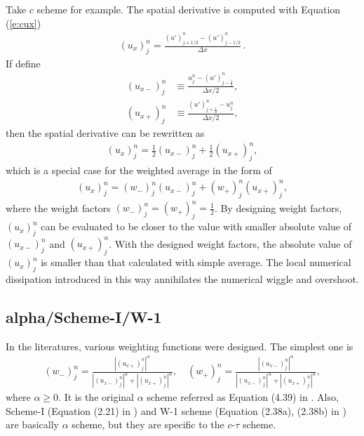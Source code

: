 \documentclass[11pt,dvips]{article}
\numberwithin{equation}{section}
\begin{document}
Take $c$ scheme for example.  The spatial derivative is computed with Equation
(\ref{e:cux})
\begin{align*}
  (u_x)_j^n = \frac{(u')_{j+1/2}^n - (u')_{j-1/2}^n}{\Delta x}\,.
\end{align*}
If define
\begin{align}
  (u_{x-})_j^n &\equiv
    \frac{u_j^n - (u')_{j-\frac{1}{2}}^n}{\Delta x/2}, \label{e:ux-} \\
  (u_{x+})_j^n &\equiv
    \frac{(u')_{j+\frac{1}{2}}^n - u_j^n}{\Delta x/2}, \label{e:ux+}
\end{align}
then the spatial derivative can be rewritten as
\begin{align*}
  (u_x)_j^n = \frac{1}{2}(u_{x-})_j^n + \frac{1}{2}(u_{x+})_j^n,
\end{align*}
which is a special case for the weighted average in the form of
\begin{align}
  (u_x)_j^n = (w_-)_j^n(u_{x-})_j^n + (w_+)_j^n(u_{x+})_j^n
    , \label{e:weighting}
\end{align}
where the weight factors $(w_-)_j^n=(w_+)_j^n=\frac{1}{2}$.  By designing
weight factors, $(u_x)_j^n$ can be evaluated to be closer to the value with
smaller absolute value of $(u_{x-})_j^n$ and $(u_{x+})_j^n$.  With the designed
weight factors, the absolute value of $(u_x)_j^n$ is smaller than that
calculated with simple average.  The local numerical dissipation introduced in
this way annihilates the numerical wiggle and
overshoot\cite{chang_multi-dimensional_2003}.

\subsection{alpha/Scheme-I/W-1}

In the literatures, various weighting functions were
designed\cite{chang_method_1995, chang_courant_2002,
chang_multi-dimensional_2003}.  The simplest one is
\begin{align}
  (w_-)_j^n =
    \frac{|(u_{x+})_j^n|^{\alpha}}
         {|(u_{x-})_j^n|^{\alpha}+|(u_{x+})_j^n|^{\alpha}}, \quad
  (w_+)_j^n =
    \frac{|(u_{x-})_j^n|^{\alpha}}
         {|(u_{x-})_j^n|^{\alpha}+|(u_{x+})_j^n|^{\alpha}}, \label{e:alpha}
\end{align}
where $\alpha\ge0$.  It is the original $\alpha$ scheme referred as Equation
(4.39) in \cite{chang_method_1995}.  Also, Scheme-I (Equation (2.21) in
\cite{chang_courant_2002}) and W-1 scheme (Equation (2.38a), (2.38b) in
\cite{chang_multi-dimensional_2003}) are basically $\alpha$ scheme, but they
are specific to the $c$-$\tau$ scheme.
\end{document}
